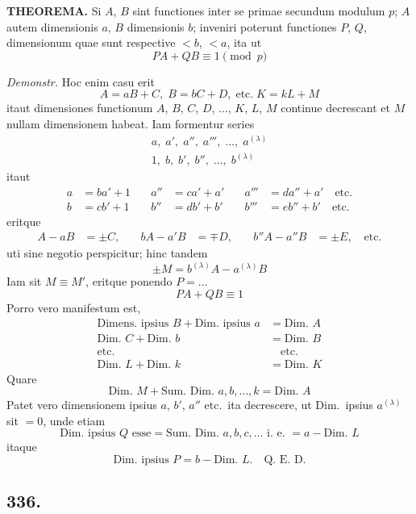 \documentclass[12pt]{article}
\begin{document}
\textbf{THEOREMA.} Si $A$, $B$ sint functiones inter se primae secundum modulum $p$; $A$ autem dimensionis $a$, $B$ dimensionis $b$; inveniri poterunt functiones $P$, $Q$, dimensionum quae sunt respective $<b$, $<a$, ita ut
\[
PA + QB \equiv 1 \pmod{p}
\]

\textit{Demonstr.} Hoc enim casu erit
\[
A = aB + C,\; B = bC + D,\; \text{etc.}\; K = kL + M
\]
itaut dimensiones functionum $A$, $B$, $C$, $D$, $\ldots$, $K$, $L$, $M$ continue decrescant et $M$ nullam dimensionem habeat. Iam formentur series
\[
\begin{aligned}
a,\; a',\; a'',\; a''',\; \ldots,\; a^{(\lambda)}\\
1,\; b,\; b',\; b'',\; \ldots,\; b^{(\lambda)}
\end{aligned}
\]
itaut
\[
\begin{aligned}
a &= ba' + 1\quad & a'' &= ca' + a'\quad & a''' &= da'' + a'\quad \text{etc.}\\
b &= cb' + 1\quad & b'' &= db' + b'\quad & b''' &= eb'' + b'\quad \text{etc.}
\end{aligned}
\]
eritque
\[
\begin{aligned}
A - aB &= \pm C,\quad & bA - a'B &= \mp D,\quad & b''A - a''B &= \pm E,\quad \text{etc.}
\end{aligned}
\]
uti sine negotio perspicitur; hinc tandem
\[
\pm M = b^{(\lambda)}A - a^{(\lambda)}B
\]
Iam sit $M\equiv M'$, eritque ponendo $P=\ldots$
\[
PA + QB \equiv 1
\]
Porro vero manifestum est,
\[
\begin{aligned}
\text{Dimens.\ ipsius } B + \text{Dim.\ ipsius } a &= \text{Dim.\ } A\\
\text{Dim.\ } C + \text{Dim.\ } b &= \text{Dim.\ } B\\
\text{etc.} & \quad \text{etc.}\\
\text{Dim.\ } L + \text{Dim.\ } k &= \text{Dim.\ } K
\end{aligned}
\]
Quare
\[
\text{Dim.\ } M + \text{Sum.\ Dim.\ } a,b,\ldots,k = \text{Dim.\ } A
\]
Patet vero dimensionem ipsius $a$, $b'$, $a''$ etc.~ita decrescere, ut Dim.~ipsius $a^{(\lambda)}$ sit $=0$, unde etiam
\[
\text{Dim.\ ipsius } Q \text{ esse} = \text{Sum.\ Dim.\ } a,b,c,\ldots \text{ i.~e.\ } = a - \text{Dim.\ } L
\]
itaque
\[
\text{Dim.\ ipsius } P = b - \text{Dim.\ } L. \quad \text{Q.~E.~D.}
\]

\subsection*{336.}
\end{document}

